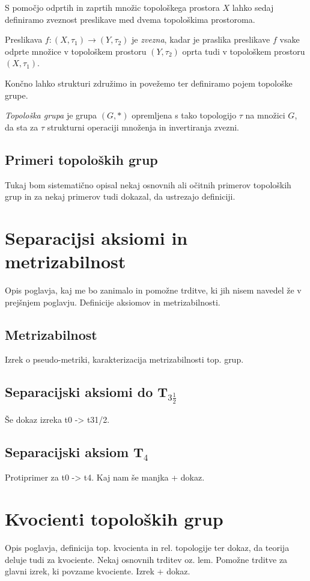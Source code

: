 \documentclass[mat1]{fmfdelo}
\begin{document}
S pomočjo odprtih in zaprtih množic topološkega prostora $X$ lahko sedaj definiramo zveznost preslikave med dvema topološkima prostoroma.

\begin{definicija}
Preslikava $f: (X, \tau_1) \to (Y, \tau_2)$ je \emph{zvezna}, kadar je praslika preslikave $f$ vsake odprte množice v topološkem prostoru $(Y, \tau_2)$ oprta tudi v topološkem prostoru $(X, \tau_1)$.
\end{definicija}

Končno lahko strukturi združimo in povežemo ter definiramo pojem topološke grupe.
\begin{definicija}
\emph{Topološka grupa} je grupa $(G, *)$ opremljena s tako topologijo $\tau$ na množici $G$, da sta za $\tau$ strukturni operaciji množenja in invertiranja zvezni. 
\end{definicija}

\subsection{Primeri topoloških grup}
Tukaj bom sistematično opisal nekaj osnovnih ali očitnih primerov topoloških grup in za nekaj primerov tudi dokazal, da ustrezajo definiciji.

\section{Separacijsi aksiomi in metrizabilnost}
Opis poglavja, kaj me bo zanimalo in pomožne trditve, ki jih nisem navedel že v prejšnjem poglavju.
Definicije aksiomov in metrizabilnosti.

\subsection{Metrizabilnost}
Izrek o pseudo-metriki, karakterizacija metrizabilnosti top. grup.

\subsection{Separacijski aksiomi do T$_{3 \frac{1}{2}}$}
Še dokaz izreka t0 -> t31/2.

\subsection{Separacijski aksiom T$_4$}
Protiprimer za t0 -> t4. Kaj nam še manjka + dokaz.

\section{Kvocienti topoloških grup}
Opis poglavja, definicija top. kvocienta in rel. topologije ter dokaz, da teorija deluje tudi za kvociente.
Nekaj osnovnih trditev oz. lem.
Pomožne trditve za glavni izrek, ki povzame kvociente.
Izrek + dokaz.
\end{document}
